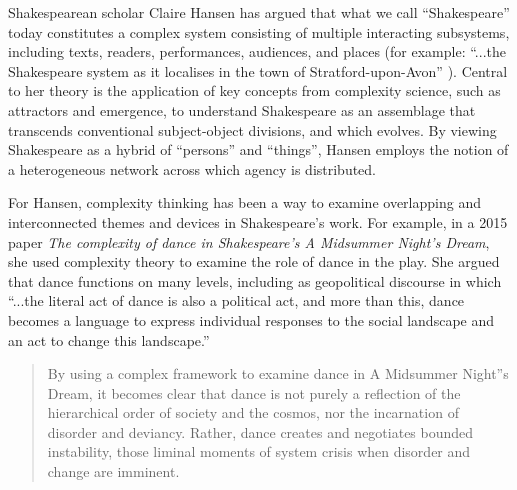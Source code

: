                 Shakespearean scholar Claire Hansen has argued that what we call “Shakespeare” today constitutes a complex system consisting of multiple interacting subsystems, including texts, readers, performances, audiences, and places (for example: “...the Shakespeare system as it localises in the town of Stratford-upon-Avon” \citep[p.5]{HansenShksprAndCmplxtyThry2017}). Central to her theory is the application of key concepts from complexity science, such as attractors and emergence, to understand Shakespeare as an assemblage that transcends conventional subject-object divisions, and which evolves. By viewing Shakespeare as a hybrid of “persons” and “things”, Hansen employs the notion of a heterogeneous network across which agency is distributed.
                
                For Hansen, complexity thinking has been a way to examine overlapping and interconnected themes and devices in Shakespeare's work. For example, in a 2015 paper \emph{The complexity of dance in Shakespeare's A Midsummer Night's Dream}, she used complexity theory to examine the role of dance in the play. She argued that dance functions on many levels, including as geopolitical discourse in which “...the literal act of dance is also a political act, and more than this, dance becomes a language to express individual responses to the social landscape and an act to change this landscape.” \citep[p.25]{HansenThCmplxtyOfDnc2015}

                \begin{quote}
                    By using a complex framework to examine dance in A Midsummer Night”s Dream, it becomes clear that dance is not purely a reflection of the hierarchical order of society and the cosmos, nor the incarnation of disorder and deviancy. Rather, dance creates and negotiates bounded instability, those liminal moments of system crisis when disorder and change are imminent. \citep[p.26]{HansenThCmplxtyOfDnc2015}
                \end{quote}

